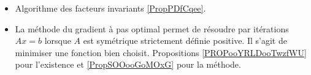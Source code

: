 
\begin{itemize}
    \item Algorithme des facteurs invariants \ref{PropPDfCqee}.
    \item La méthode du gradient à pas optimal permet de résoudre par itérations \( Ax=b\) lorsque \( A\) est symétrique strictement définie positive. Il s'agit de minimiser une fonction bien choisit. Propositions \ref{PROPooYRLDooTwzfWU} pour l'existence et \ref{PropSOOooGoMOxG} pour la méthode.
\end{itemize}

